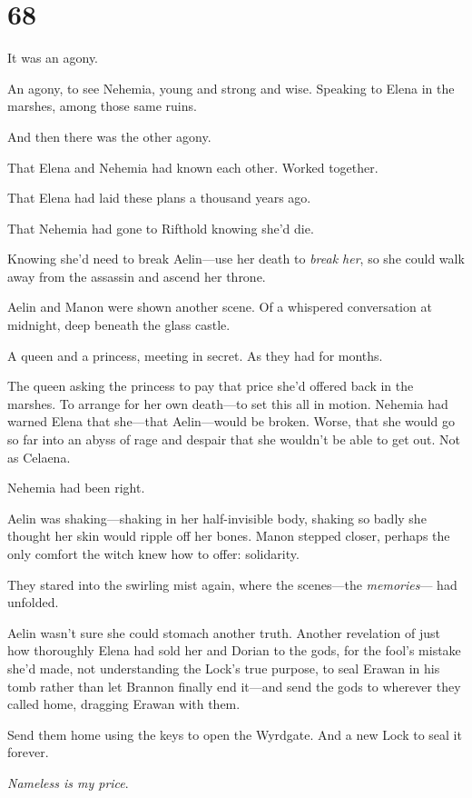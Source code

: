 
\chapter{68}

It was an agony.

An agony, to see Nehemia, young and strong and wise. Speaking to Elena in the marshes, among those same ruins.

And then there was the other agony.

That Elena and Nehemia had known each other. Worked together.

That Elena had laid these plans a thousand years ago.

That Nehemia had gone to Rifthold knowing she'd die.

Knowing she'd need to break Aelin---use her death to \emph{break her}, so she could walk away from the assassin and ascend her throne.

Aelin and Manon were shown another scene. Of a whispered conversation at midnight, deep beneath the glass castle.

A queen and a princess, meeting in secret. As they had for months.

The queen asking the princess to pay that price she'd offered back in the marshes. To arrange for her own death---to set this all in motion. Nehemia had warned Elena that she---that Aelin---would be broken. Worse, that she would go so far into an abyss of rage and despair that she wouldn't be able to get out. Not as Celaena.

Nehemia had been right.

Aelin was shaking---shaking in her half-invisible body, shaking so badly she thought her skin would ripple off her bones. Manon stepped closer, perhaps the only comfort the witch knew how to offer: solidarity.

They stared into the swirling mist again, where the scenes---the
\emph{memories}--- had unfolded.

Aelin wasn't sure she could stomach another truth. Another revelation of just how thoroughly Elena had sold her and Dorian to the gods, for the fool's mistake she'd made, not understanding the Lock's true purpose, to seal Erawan in his tomb rather than let Brannon finally end it---and send the gods to wherever they called home, dragging Erawan with them.

Send them home  using the keys to open the Wyrdgate. And a new Lock to seal it forever.

\emph{Nameless is my price}.

